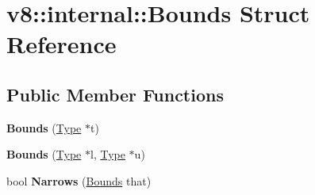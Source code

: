 \hypertarget{structv8_1_1internal_1_1_bounds}{}\section{v8\+:\+:internal\+:\+:Bounds Struct Reference}
\label{structv8_1_1internal_1_1_bounds}
\subsection*{Public Member Functions}
\begin{DoxyCompactItemize}
\item 
{\bfseries Bounds} (\hyperlink{classv8_1_1internal_1_1_type}{Type} $\ast$t)\hypertarget{structv8_1_1internal_1_1_bounds_ab7a5bcfb2d5e749d3adf62183e305f58}{}\label{structv8_1_1internal_1_1_bounds_ab7a5bcfb2d5e749d3adf62183e305f58}

\item 
{\bfseries Bounds} (\hyperlink{classv8_1_1internal_1_1_type}{Type} $\ast$l, \hyperlink{classv8_1_1internal_1_1_type}{Type} $\ast$u)\hypertarget{structv8_1_1internal_1_1_bounds_a598565b99a2437204ae45fa0e2fe2c84}{}\label{structv8_1_1internal_1_1_bounds_a598565b99a2437204ae45fa0e2fe2c84}

\item 
bool {\bfseries Narrows} (\hyperlink{structv8_1_1internal_1_1_bounds}{Bounds} that)\hypertarget{structv8_1_1internal_1_1_bounds_a2d8d8990e5d3ff3654a70fbdb1f06cac}{}\label{structv8_1_1internal_1_1_bounds_a2d8d8990e5d3ff3654a70fbdb1f06cac}

\end{DoxyCompactItemize}
